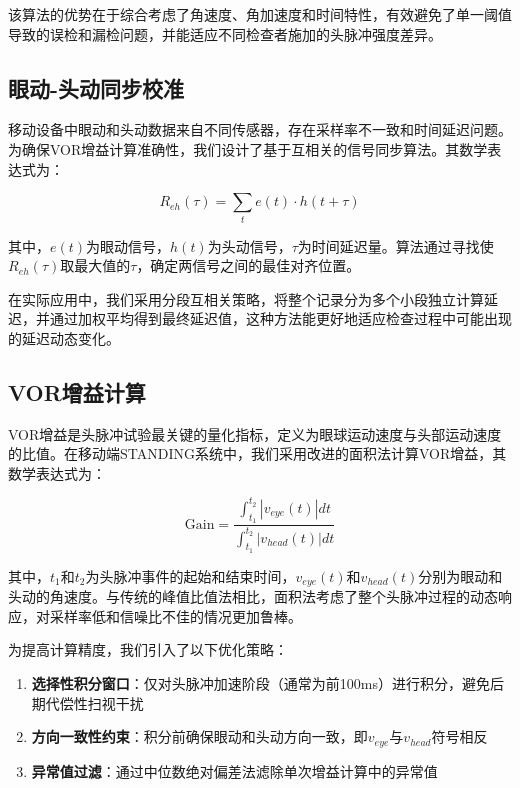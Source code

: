 该算法的优势在于综合考虑了角速度、角加速度和时间特性，有效避免了单一阈值导致的误检和漏检问题，并能适应不同检查者施加的头脉冲强度差异。

\subsection{眼动-头动同步校准}

移动设备中眼动和头动数据来自不同传感器，存在采样率不一致和时间延迟问题。为确保VOR增益计算准确性，我们设计了基于互相关的信号同步算法。其数学表达式为：

\begin{equation}
R_{eh}(\tau) = \sum_{t} e(t) \cdot h(t+\tau)
\end{equation}

其中，$e(t)$为眼动信号，$h(t)$为头动信号，$\tau$为时间延迟量。算法通过寻找使$R_{eh}(\tau)$取最大值的$\tau$，确定两信号之间的最佳对齐位置。

在实际应用中，我们采用分段互相关策略，将整个记录分为多个小段独立计算延迟，并通过加权平均得到最终延迟值，这种方法能更好地适应检查过程中可能出现的延迟动态变化。

\subsection{VOR增益计算}

VOR增益是头脉冲试验最关键的量化指标，定义为眼球运动速度与头部运动速度的比值。在移动端STANDING系统中，我们采用改进的面积法计算VOR增益，其数学表达式为：

\begin{equation}
\text{Gain} = \frac{\int_{t_1}^{t_2} |v_{eye}(t)| dt}{\int_{t_1}^{t_2} |v_{head}(t)| dt}
\end{equation}

其中，$t_1$和$t_2$为头脉冲事件的起始和结束时间，$v_{eye}(t)$和$v_{head}(t)$分别为眼动和头动的角速度。与传统的峰值比值法相比，面积法考虑了整个头脉冲过程的动态响应，对采样率低和信噪比不佳的情况更加鲁棒。

为提高计算精度，我们引入了以下优化策略：

\begin{enumerate}
  \item \textbf{选择性积分窗口}：仅对头脉冲加速阶段（通常为前100ms）进行积分，避免后期代偿性扫视干扰
  \item \textbf{方向一致性约束}：积分前确保眼动和头动方向一致，即$v_{eye}$与$v_{head}$符号相反
  \item \textbf{异常值过滤}：通过中位数绝对偏差法滤除单次增益计算中的异常值
\end{enumerate}


